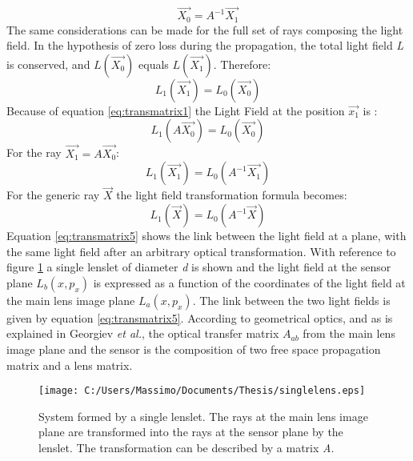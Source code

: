    \begin{equation}
   \label{eq:transmatrix2}
   \overrightarrow{X_0}=A^{-1}\overrightarrow{X_1}
   \end{equation}
   The same considerations can be made for the full set of rays composing the light field. In the hypothesis of zero loss during the propagation, the total light field \textit{L} is conserved, and $L(\overrightarrow{X_0})$ equals $L(\overrightarrow{X_1})$. Therefore:
   \begin{equation}
   \label{eq:transmatrix3}
   L_1(\overrightarrow{X_1})=L_0(\overrightarrow{X_0})
   \end{equation} 
   Because of equation \ref{eq:transmatrix1} the Light Field at the position $\overrightarrow{x_1}$ is :
   \begin{equation}
   \label{eq:transmatrix4}
   L_1(A\overrightarrow{X_0})=L_0(\overrightarrow{X_0})
   \end{equation}
   For the ray $\overrightarrow{X_1}=A\overrightarrow{X_0}$:
   \begin{equation}
   \label{eq:transmatrix8}
   L_1(\overrightarrow{X_1})=L_0(A^{-1}\overrightarrow{X_1})
   \end{equation}
   For the generic ray $\overrightarrow{X}$ the light field transformation formula becomes:
   \begin{equation}
   \label{eq:transmatrix5}
   L_1(\overrightarrow{X})=L_0(A^{-1}\overrightarrow{X})
   \end{equation}
   Equation \ref{eq:transmatrix5} shows the link between the light field at a plane, with the same light field after an arbitrary optical transformation.
     With reference to figure \ref{fig:basystem} a single lenslet of diameter \textit{d} is shown and the light field at the sensor plane $L_b(x,p_x)$ is expressed as a function of the coordinates of the light field at the main lens image plane $L_a(x,p_x)$. The link between the two light fields is given by equation \ref{eq:transmatrix5}. According to geometrical optics, and as is explained in Georgiev \textit{et al.}\cite{georgiev2011plenoptic}, the optical transfer matrix $A_{ab}$ from the main lens image plane and the sensor is the composition of two free space propagation matrix and a lens matrix.
      \begin{figure}[H]
      	\centering
      	\texttt{[image: C:/Users/Massimo/Documents/Thesis/singlelens.eps]}
      	\caption{\label{fig:basystem} System formed by a single lenslet. The rays at the main lens image plane are transformed into the rays at the sensor plane by the lenslet. The transformation can be described by a matrix \textit{A}. }
      \end{figure}
